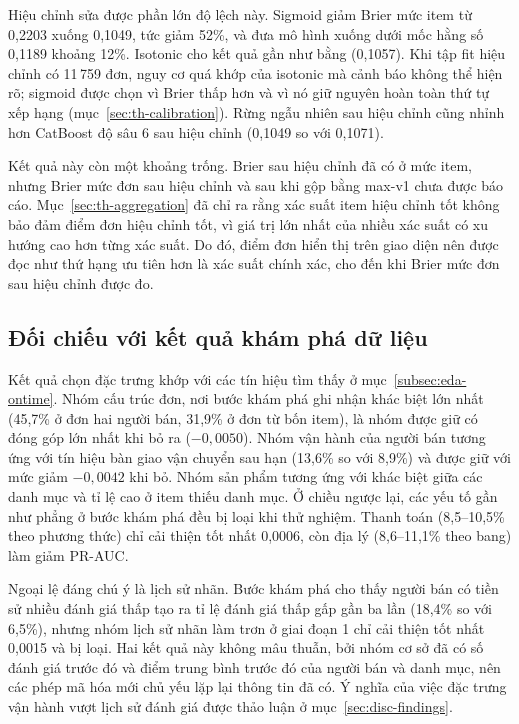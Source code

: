 Hiệu chỉnh sửa được phần lớn độ lệch này. Sigmoid giảm Brier mức item từ 0,2203 xuống 0,1049, tức giảm 52\%, và đưa mô hình xuống dưới mốc hằng số 0,1189 khoảng 12\%. Isotonic cho kết quả gần như bằng (0,1057). Khi tập fit hiệu chỉnh có 11\,759 đơn, nguy cơ quá khớp của isotonic mà \textcite{niculescumizil2005} cảnh báo không thể hiện rõ; sigmoid được chọn vì Brier thấp hơn và vì nó giữ nguyên hoàn toàn thứ tự xếp hạng (mục~\ref{sec:th-calibration}). Rừng ngẫu nhiên sau hiệu chỉnh cũng nhỉnh hơn CatBoost độ sâu 6 sau hiệu chỉnh (0,1049 so với 0,1071).

Kết quả này còn một khoảng trống. Brier sau hiệu chỉnh đã có ở mức item, nhưng Brier mức đơn sau hiệu chỉnh và sau khi gộp bằng max-v1 chưa được báo cáo. Mục~\ref{sec:th-aggregation} đã chỉ ra rằng xác suất item hiệu chỉnh tốt không bảo đảm điểm đơn hiệu chỉnh tốt, vì giá trị lớn nhất của nhiều xác suất có xu hướng cao hơn từng xác suất. Do đó, điểm đơn hiển thị trên giao diện nên được đọc như thứ hạng ưu tiên hơn là xác suất chính xác, cho đến khi Brier mức đơn sau hiệu chỉnh được đo.

\subsection{Đối chiếu với kết quả khám phá dữ liệu}\label{sec:analysis-eda}

Kết quả chọn đặc trưng khớp với các tín hiệu tìm thấy ở mục~\ref{subsec:eda-ontime}. Nhóm cấu trúc đơn, nơi bước khám phá ghi nhận khác biệt lớn nhất (45,7\% ở đơn hai người bán, 31,9\% ở đơn từ bốn item), là nhóm được giữ có đóng góp lớn nhất khi bỏ ra ($-0{,}0050$). Nhóm vận hành của người bán tương ứng với tín hiệu bàn giao vận chuyển sau hạn (13,6\% so với 8,9\%) và được giữ với mức giảm $-0{,}0042$ khi bỏ. Nhóm sản phẩm tương ứng với khác biệt giữa các danh mục và tỉ lệ cao ở item thiếu danh mục. Ở chiều ngược lại, các yếu tố gần như phẳng ở bước khám phá đều bị loại khi thử nghiệm. Thanh toán (8,5--10,5\% theo phương thức) chỉ cải thiện tốt nhất 0,0006, còn địa lý (8,6--11,1\% theo bang) làm giảm PR-AUC.

Ngoại lệ đáng chú ý là lịch sử nhãn. Bước khám phá cho thấy người bán có tiền sử nhiều đánh giá thấp tạo ra tỉ lệ đánh giá thấp gấp gần ba lần (18,4\% so với 6,5\%), nhưng nhóm lịch sử nhãn làm trơn ở giai đoạn 1 chỉ cải thiện tốt nhất 0,0015 và bị loại. Hai kết quả này không mâu thuẫn, bởi nhóm cơ sở đã có số đánh giá trước đó và điểm trung bình trước đó của người bán và danh mục, nên các phép mã hóa mới chủ yếu lặp lại thông tin đã có. Ý nghĩa của việc đặc trưng vận hành vượt lịch sử đánh giá được thảo luận ở mục~\ref{sec:disc-findings}.

